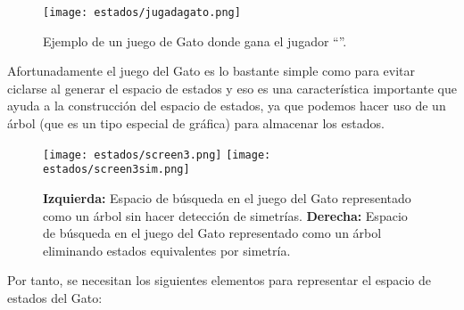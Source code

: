 \begin{figure}
  \centering
  \texttt{[image: estados/jugadagato.png]}
  \caption{Ejemplo de un juego de Gato donde gana el jugador \enquote{}.}
  \label{fig:tictactoe}
\end{figure}

Afortunadamente el juego del Gato es lo bastante simple como para evitar ciclarse al generar el espacio de estados y eso es una característica importante que ayuda a la construcción del espacio de estados, ya que  podemos hacer uso de un árbol (que es un tipo especial de gráfica) para almacenar los estados.\par


\begin{figure}
  \centering
  \texttt{[image: estados/screen3.png]}
  \texttt{[image: estados/screen3sim.png]}
  \caption{\textbf{Izquierda:} Espacio de búsqueda en el juego del Gato representado como un árbol sin hacer detección de simetrías. \textbf{Derecha:} Espacio de búsqueda en el juego del Gato representado como un árbol eliminando estados equivalentes por simetría.}
  \label{fig:espaciogato}
\end{figure}

Por tanto, se necesitan los siguientes elementos para representar el espacio de estados del Gato:


